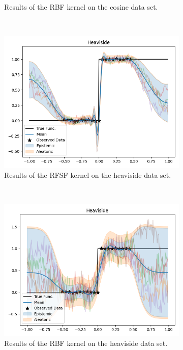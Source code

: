 \begin{figure}
\begin{subfigure}{0.49\linewidth}
        \caption{Results of the \acs{RBF} kernel on the cosine data set.}
    \end{subfigure}
	\\[0.5cm]
    \begin{subfigure}{0.49\linewidth}
        \centering
        \includegraphics[width=\linewidth, height=0.618033988749895\linewidth]{graphics/generated/gp-heaviside-rfsf.png}  %
        \caption{Results of the \acs{RFSF} kernel on the heaviside data set.}
    \end{subfigure}
	~
    \begin{subfigure}{0.49\linewidth}
        \centering
        \includegraphics[width=\linewidth, height=0.618033988749895\linewidth]{graphics/generated/gp-heaviside-rbf.png}  %
        \caption{Results of the \acs{RBF} kernel on the heaviside data set.}
    \end{subfigure}
    \\[0.5cm]
    \begin{subfigure}{0.49\linewidth}

\end{subfigure}
\end{figure}

